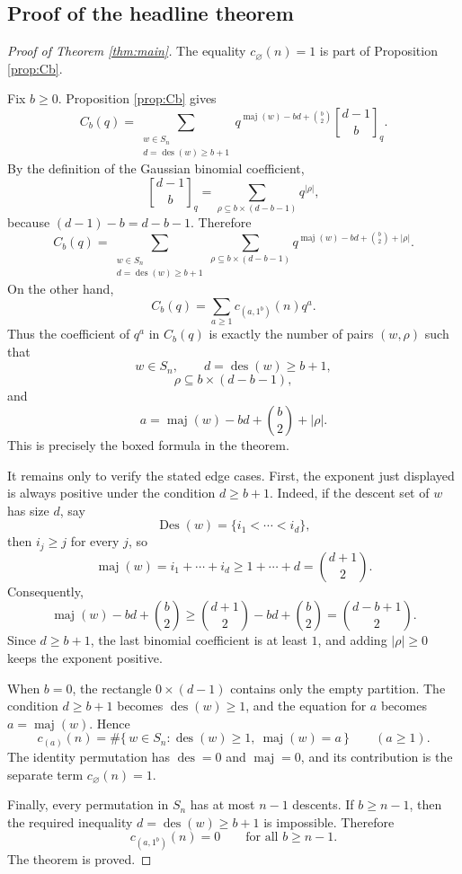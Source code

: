 \documentclass[12pt]{article}
\DeclareMathOperator{\Des}{Des}
\DeclareMathOperator{\des}{des}
\DeclareMathOperator{\maj}{maj}
\newcommand{\qbinom}[2]{\genfrac{[}{]}{0pt}{}{#1}{#2}_q}
\begin{document}
\subsection{Proof of the headline theorem}

\begin{proof}[Proof of Theorem \ref{thm:main}]
The equality \(c_{\varnothing}(n)=1\) is part of Proposition \ref{prop:Cb}.

Fix \(b\ge 0\).  Proposition \ref{prop:Cb} gives
\[
C_b(q)
=
\sum_{\substack{w\in S_n\\ d=\des(w)\ge b+1}}
q^{\maj(w)-bd+\binom{b}{2}}
\qbinom{d-1}{b}.
\]
By the definition of the Gaussian binomial coefficient,
\[
\qbinom{d-1}{b}
=
\sum_{\rho\subseteq b\times(d-b-1)}q^{|\rho|},
\]
because \((d-1)-b=d-b-1\).  Therefore
\[
C_b(q)
=
\sum_{\substack{w\in S_n\\ d=\des(w)\ge b+1}}
\sum_{\rho\subseteq b\times(d-b-1)}
q^{\maj(w)-bd+\binom{b}{2}+|\rho|}.
\]
On the other hand,
\[
C_b(q)=\sum_{a\ge 1}c_{(a,1^b)}(n)q^a.
\]
Thus the coefficient of \(q^a\) in \(C_b(q)\) is exactly the number of pairs \((w,\rho)\) such that
\[
w\in S_n,\qquad d=\des(w)\ge b+1,
\]
\[
\rho\subseteq b\times(d-b-1),
\]
and
\[
a=\maj(w)-bd+\binom{b}{2}+|\rho|.
\]
This is precisely the boxed formula in the theorem.

It remains only to verify the stated edge cases.  First, the exponent just displayed is always positive under the condition \(d\ge b+1\).  Indeed, if the descent set of \(w\) has size \(d\), say
\[
\Des(w)=\{i_1<\cdots<i_d\},
\]
then \(i_j\ge j\) for every \(j\), so
\[
\maj(w)=i_1+\cdots+i_d\ge 1+\cdots+d=\binom{d+1}{2}.
\]
Consequently,
\[
\maj(w)-bd+\binom{b}{2}
\ge
\binom{d+1}{2}-bd+\binom{b}{2}
=
\binom{d-b+1}{2}.
\]
Since \(d\ge b+1\), the last binomial coefficient is at least \(1\), and adding \(|\rho|\ge 0\) keeps the exponent positive.

When \(b=0\), the rectangle \(0\times(d-1)\) contains only the empty partition.  The condition \(d\ge b+1\) becomes \(\des(w)\ge 1\), and the equation for \(a\) becomes \(a=\maj(w)\).  Hence
\[
c_{(a)}(n)
=
\#\{\,w\in S_n:\des(w)\ge 1,\ \maj(w)=a\,\}
\qquad (a\ge 1).
\]
The identity permutation has \(\des=0\) and \(\maj=0\), and its contribution is the separate term \(c_{\varnothing}(n)=1\).

Finally, every permutation in \(S_n\) has at most \(n-1\) descents.  If \(b\ge n-1\), then the required inequality \(d=\des(w)\ge b+1\) is impossible.  Therefore
\[
c_{(a,1^b)}(n)=0
\qquad\text{for all }b\ge n-1.
\]
The theorem is proved.
\end{proof}
\end{document}

